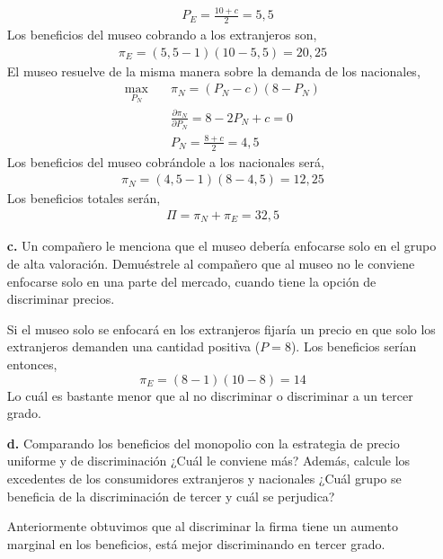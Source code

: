 \documentclass{exam}
\begin{document}
\begin{itemize}
\begin{solution}
\begin{align*}
            & P_E = \frac{10+c}{2} = 5,5
        \end{align*}
        Los beneficios del museo cobrando a los extranjeros son, 
        \begin{align*}
            \pi_E = (5,5-1)(10-5,5) = 20,25
        \end{align*}
        El museo resuelve de la misma manera sobre la demanda de los nacionales,
        \begin{align*}
            \max_{P_N} \quad & \pi_N = (P_N-c)(8-P_N) \\
            & \frac{\partial \pi_N}{\partial P_N} = 8-2P_N + c = 0 \\
            & P_N = \frac{8+c}{2} = 4,5
        \end{align*}
        Los beneficios del museo cobrándole a los nacionales será,
        \begin{align*}
            \pi_N = (4,5-1)(8-4,5) = 12,25
        \end{align*}
        Los beneficios totales serán,
        \begin{align*}
            \Pi = \pi_N + \pi_E = 32,5
        \end{align*}
    \end{solution}
    \item[\textbf{c.}] Un compañero le menciona que el museo debería enfocarse solo en el grupo de alta valoración. Demuéstrele al compañero que al museo no le conviene enfocarse solo en una parte del mercado, cuando tiene la opción de discriminar precios. 
    \begin{solution}
        Si el museo solo se enfocará en los extranjeros fijaría un precio en que solo los extranjeros demanden una cantidad positiva ($P = 8$). Los beneficios serían entonces,
        \begin{equation*}
            \pi_E = (8-1)(10-8) = 14
        \end{equation*}
        Lo cuál es bastante menor que al no discriminar o discriminar a un tercer grado. 
    \end{solution}
    \item[\textbf{d.}] Comparando los beneficios del monopolio con la estrategia de precio uniforme y de discriminación ¿Cuál le conviene más? Además, calcule los excedentes de los consumidores extranjeros y nacionales ¿Cuál grupo se beneficia de la discriminación de tercer y cuál se perjudica?
    \begin{solution}
        Anteriormente obtuvimos que al discriminar la firma tiene un aumento marginal en los beneficios, está mejor discriminando en tercer grado. 


\end{solution}
\end{itemize}
\end{document}
